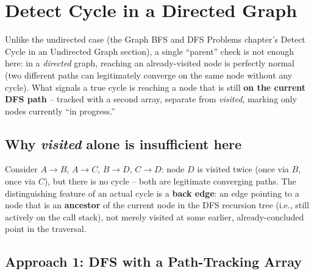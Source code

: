 \section{Detect Cycle in a Directed Graph}
\label{sec:graph-cycle-directed}


\begin{patternbox}
Unlike the undirected case (the Graph BFS and DFS Problems chapter's Detect Cycle in an Undirected Graph section),
a single ``parent'' check is not enough here: in a \emph{directed}
graph, reaching an already-visited node is perfectly normal (two
different paths can legitimately converge on the same node without any
cycle). What signals a true cycle is reaching a node that is still
\textbf{on the current DFS path} -- tracked with a second array,
separate from \textit{visited}, marking only nodes currently ``in
progress.''
\end{patternbox}

\subsection*{Why \textit{visited} alone is insufficient here}

Consider $A \to B$, $A \to C$, $B \to D$, $C \to D$: node $D$ is
visited twice (once via $B$, once via $C$), but there is no cycle --
both are legitimate converging paths. The distinguishing feature of an
actual cycle is a \textbf{back edge}: an edge pointing to a node that
is an \textbf{ancestor} of the current node in the DFS recursion tree
(i.e., still actively on the call stack), not merely visited at some
earlier, already-concluded point in the traversal.

\subsection*{Approach 1: DFS with a Path-Tracking Array}

